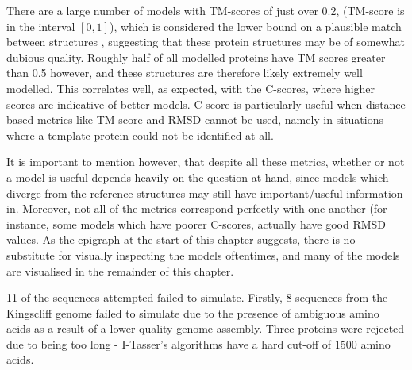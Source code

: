 There are a large number of models with TM-scores of just over 0.2, (TM-score is in the interval $[0,1]$), which is considered the lower bound on a plausible match between structures \citep{Zhang2005}, suggesting that these protein structures may be of somewhat dubious quality. Roughly half of all modelled proteins have TM scores greater than 0.5 however, and these structures are therefore likely extremely well modelled. This correlates well, as expected, with the C-scores, where higher scores are indicative of better models. C-score is particularly useful when distance based metrics like TM-score and RMSD cannot be used, namely in situations where a template protein could not be identified at all.

It is important to mention however, that despite all these metrics, whether or not a model is useful depends heavily on the question at hand, since models which diverge from the reference structures may still have important/useful information in. Moreover, not all of the metrics correspond perfectly with one another (for instance, some models which have poorer C-scores, actually have good RMSD values. As the epigraph at the start of this chapter suggests, there is no substitute for visually inspecting the models oftentimes, and many of the models are visualised in the remainder of this chapter.

11 of the sequences attempted failed to simulate. Firstly, 8 sequences from the \Pasy{} Kingscliff genome failed to simulate due to the presence of ambiguous amino acids as a result of a lower quality genome assembly. Three proteins were rejected due to being too long - I-Tasser's algorithms have a hard cut-off of 1500 amino acids. 


